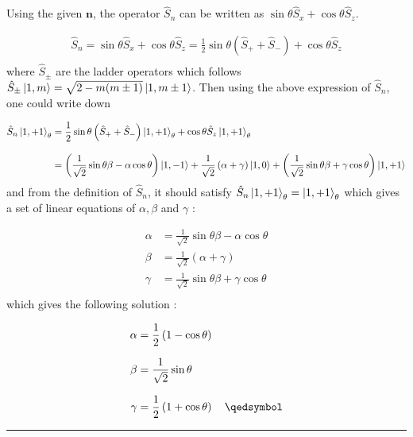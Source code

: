 \begin{solution}
Using the given $\mathbf{n}$, the operator $\hat{S}_n$ can be written as $\sin\theta \hat{S}_x + \cos \theta \hat{S}_z$. 

\begin{align*}
    \hat{S}_n = \sin\theta \hat{S}_x + \cos \theta \hat{S}_z = \frac{1}{2}\sin\theta \left(\hat{S}_+ + \hat{S}_-\right) + \cos \theta \hat{S}_z \\
\end{align*}
where $\hat{S}_\pm$ are the ladder operators which follows $\hat{S}_\pm \ket{1,m} = \sqrt{2-m(m\pm 1)}\ket{1,m\pm 1}$. Then using the above expression of $\hat{S}_n$, one could write down 

\begin{align*}
    \hat{S}_n  \ket{1,+1}_\theta &= \frac{1}{2}\sin\theta \left(\hat{S}_+ + \hat{S}_-\right)  \ket{1,+1}_\theta  + \cos \theta \hat{S}_z  \ket{1,+1}_\theta \\[0.12in]
    &= \left(\frac{1}{\sqrt{2}}\sin\theta\beta -\alpha\cos\theta \right) \ket{1,-1} + \frac{1}{\sqrt{2}} \left(\alpha+\gamma\right)\ket{1,0} + \left( \frac{1}{\sqrt{2}}\sin\theta\beta + \gamma\cos\theta \right) \ket{1,+1} \\
\end{align*}
and from the definition of $\hat{S}_n$, it should satisfy $\hat{S}_n \ket{1,+1}_\theta=\ket{1,+1}_\theta$ which gives a set of linear equations of $\alpha,\beta$ and $\gamma$ : 

\begin{align*}
    \alpha &= \frac{1}{\sqrt{2}}\sin\theta\beta -\alpha\cos\theta  \\[0.1in]
    \beta  &=  \frac{1}{\sqrt{2}} \left(\alpha+\gamma\right)\\[0.1in]
    \gamma &=  \frac{1}{\sqrt{2}}\sin\theta\beta + \gamma\cos\theta \\
\end{align*}
which gives the following solution : 

\begin{align*}
    \alpha &=  \frac{1}{2}\left(1-\cos\theta\right)  \\[0.1in]
    \beta  &=  \frac{1}{\sqrt{2}} \sin\theta \\[0.1in]
    \gamma &=  \frac{1}{2}\left(1+\cos\theta\right)  \qed \\
\end{align*}
\end{solution}

\noindent\rule{7in}{1.5pt}

